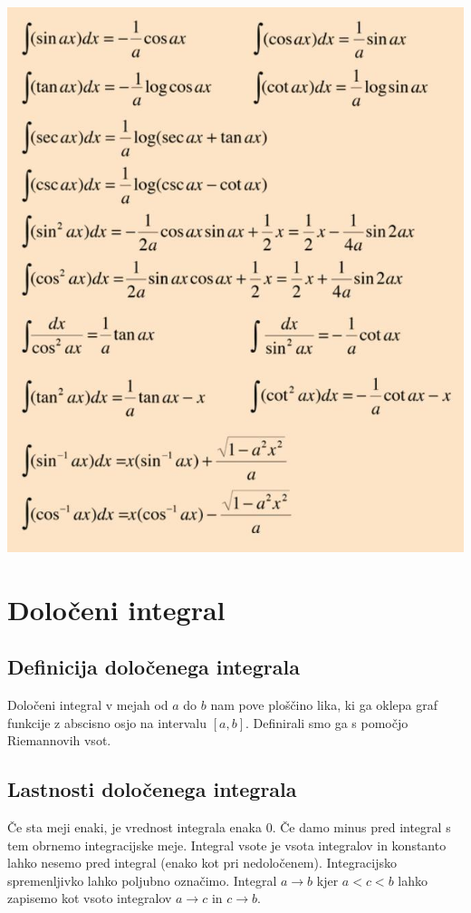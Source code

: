 \documentclass[12pt]{report}
\begin{document}
 
  \begin{slika}[H]
  \centering
  \includegraphics[width = \textwidth]{70}
\end{slika} 


\chapter*{Določeni integral}


\section*{Definicija določenega integrala}
Določeni integral v mejah od $a$ do $ b$ nam pove ploščino lika, ki ga oklepa graf funkcije z abscisno osjo na intervalu $[a,b]$. Definirali smo ga s pomočjo Riemannovih vsot.

\section*{Lastnosti določenega integrala}
Če sta meji enaki, je vrednost integrala enaka 0.
Če damo minus pred integral s tem obrnemo integracijske meje.
Integral vsote je vsota integralov in konstanto lahko nesemo pred integral (enako kot pri nedoločenem).
Integracijsko spremenljivko lahko poljubno označimo.
Integral $a \to b$ kjer $a < c < b$ lahko zapisemo kot vsoto integralov  $a \to c$ in  $c \to b$.
\end{document}
